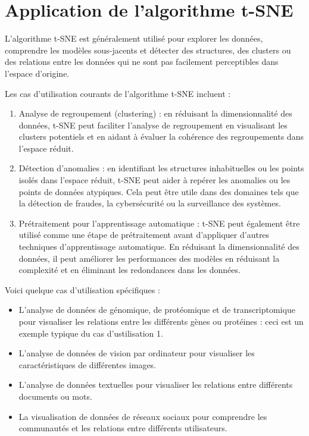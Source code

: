 \documentclass[12pt,a4paper]{article}
\begin{document}
	\newpage
	\section{Application de l'algorithme t-SNE}
	L'algorithme t-SNE est généralement utilisé pour explorer les données, comprendre les modèles sous-jacents et détecter des structures, des clusters ou des relations entre les données qui ne sont pas facilement perceptibles dans l'espace d'origine.
	
	Les cas d'utilisation courants de l'algorithme t-SNE incluent :
	\begin{enumerate}
		\item Analyse de regroupement (clustering) : en réduisant la dimensionnalité des données, t-SNE peut faciliter l'analyse de regroupement en visualisant les clusters potentiels et en aidant à évaluer la cohérence des regroupements dans l'espace réduit.
		\item Détection d'anomalies : en identifiant les structures inhabituelles ou les points isolés dans l'espace réduit, t-SNE peut aider à repérer les anomalies ou les points de données atypiques. Cela peut être utile dans des domaines tels que la détection de fraudes, la cybersécurité ou la surveillance des systèmes.
		\item Prétraitement pour l'apprentissage automatique : t-SNE peut également être utilisé comme une étape de prétraitement avant d'appliquer d'autres techniques d'apprentissage automatique. En réduisant la dimensionnalité des données, il peut améliorer les performances des modèles en réduisant la complexité et en éliminant les redondances dans les données.
	\end{enumerate}
	
	Voici quelque cas d'utilisation spécifiques :
	\begin{itemize}
		\item L'analyse de données de génomique, de protéomique et de transcriptomique pour visualiser les relations entre les différents gènes ou protéines : ceci est un exemple typique du cas d'ustilisation 1.
		\item L'analyse de données de vision par ordinateur pour visualiser les caractéristiques de différentes images.
		\item L'analyse de données textuelles pour visualiser les relations entre différents documents ou mots.
		\item La visualisation de données de réseaux sociaux pour comprendre les communautés et les relations entre différents utilisateurs.
	\end{itemize}
	
\end{document}
